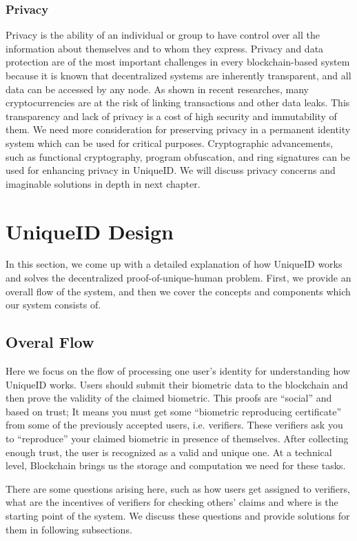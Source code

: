 \documentclass[conference]{IEEEtran}
\begin{document}
\subsubsection{Privacy}
Privacy is the ability of an individual or group to have control over all the information about themselves and to whom they express. 
Privacy and data protection are of the most important challenges in every blockchain-based system because it is known that decentralized systems are inherently transparent, and all data can be accessed by any node. As shown in recent researches, many cryptocurrencies are at the risk of linking transactions and other data leaks. This transparency and lack of privacy is a cost of high security and immutability of them. We need more consideration for preserving privacy in a permanent identity system which can be used for critical purposes. Cryptographic advancements, such as functional cryptography, program obfuscation, and ring signatures can be used for enhancing privacy in UniqueID. We will discuss privacy concerns and imaginable solutions in depth in next chapter.


\section{UniqueID Design}
In this section, we come up with a detailed explanation of how UniqueID works and solves the decentralized proof-of-unique-human problem. First, we provide an overall flow of the system, and then we cover the concepts and components which our system consists of.

\subsection{Overal Flow}

Here we focus on the flow of processing one user's identity for understanding how UniqueID works.  Users should submit their biometric data to the blockchain and then prove the validity of the claimed biometric. This proofs are “social” and based on trust; It means you must get some “biometric reproducing certificate” from some of the previously accepted users, i.e. verifiers. These verifiers ask you to “reproduce” your claimed biometric in presence of themselves. After collecting enough trust, the user is recognized as a valid and unique one. At a technical level, Blockchain brings us the storage and computation we need for these tasks.


There are some questions arising here, such as how users get assigned to verifiers, what are the incentives of verifiers for checking others' claims and where is the starting point of the system. We discuss these questions and provide solutions for them in following subsections.
\end{document}
